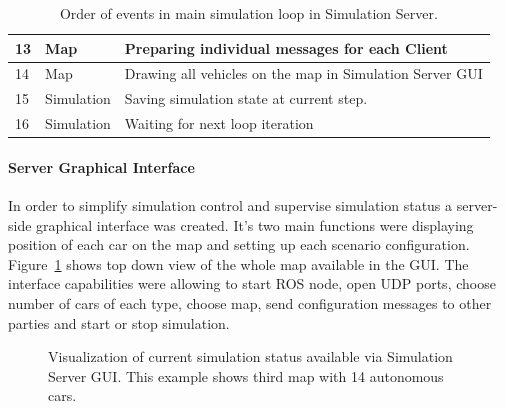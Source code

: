 \documentclass[11pt,english]{article}
\begin{document}
\begin{table}[]
\begin{tabular}{|l|p{2cm}|p{11cm}|}
13        & Map                                 & Preparing individual messages for each Client                                                          \\ \hline
14        & Map                                 & Drawing all vehicles on the map in Simulation Server GUI                                               \\ \hline
15        & Simulation                          & Saving simulation state at current step.                                                               \\ \hline
16        & Simulation                          & Waiting for next loop iteration                                                                        \\ \hline
\end{tabular}
\caption{Order of events in main simulation loop in Simulation Server.}
\label{table:order_server}
\end{table}


\paragraph{Server Graphical Interface}


In order to simplify simulation control and supervise simulation status a server-side graphical interface was created. It's two main functions were displaying position of each car on the map and setting up each scenario configuration. Figure~\ref{fig:master_gui_small} shows top down view of the whole map available in the GUI. The interface capabilities were allowing to start ROS node, open UDP ports, choose number of cars of each type, choose map, send configuration messages to other parties and start or stop simulation. 

\begin{figure}[!] %
\caption{Visualization of current simulation status available via Simulation Server GUI. This example shows third map with 14 autonomous cars.}
\label{fig:master_gui_small}
\end{figure} 
\end{document}
